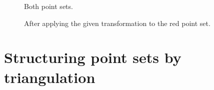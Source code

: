 \begin{figure}
	\centering
	\begin{minipage}[t]{0.49\linewidth}
		\centering
		\caption{Both point sets.}
		\label{fig:TestTransInput}
	\end{minipage}
	\hfill
	\begin{minipage}[t]{0.49\linewidth}
		\centering
		\caption{After applying the given transformation to the red point set.}
		\label{fig:TestTransResult}
	\end{minipage}
\end{figure}

\section{Structuring point sets by triangulation}

